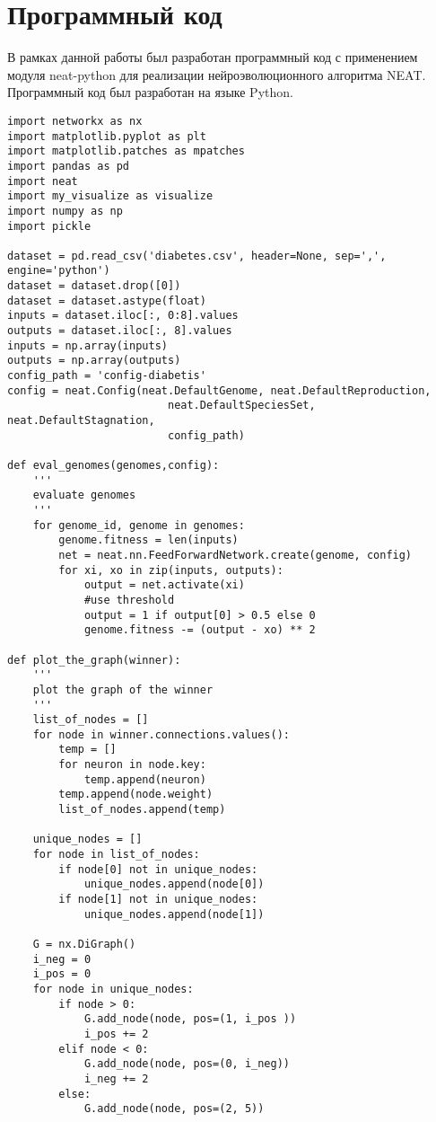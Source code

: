 \section{Программный код}
В рамках данной работы был разработан программный код с применением модуля neat-python для реализации нейроэволюционного алгоритма NEAT. Программный код был разработан на языке Python.

\begin{lstlisting}[style=pythonstyle, caption={Программный код реализации алгоритма NEAT с применением модуля neat-python}, label={lst:pythoncode}]
import networkx as nx
import matplotlib.pyplot as plt
import matplotlib.patches as mpatches
import pandas as pd
import neat
import my_visualize as visualize
import numpy as np
import pickle

dataset = pd.read_csv('diabetes.csv', header=None, sep=',', engine='python')
dataset = dataset.drop([0])
dataset = dataset.astype(float)
inputs = dataset.iloc[:, 0:8].values
outputs = dataset.iloc[:, 8].values
inputs = np.array(inputs)
outputs = np.array(outputs)
config_path = 'config-diabetis'
config = neat.Config(neat.DefaultGenome, neat.DefaultReproduction,
                         neat.DefaultSpeciesSet, neat.DefaultStagnation,
                         config_path)

def eval_genomes(genomes,config):
    '''
    evaluate genomes
    '''
    for genome_id, genome in genomes:
        genome.fitness = len(inputs)
        net = neat.nn.FeedForwardNetwork.create(genome, config)
        for xi, xo in zip(inputs, outputs):
            output = net.activate(xi)
            #use threshold
            output = 1 if output[0] > 0.5 else 0
            genome.fitness -= (output - xo) ** 2

def plot_the_graph(winner):
    '''
    plot the graph of the winner
    '''
    list_of_nodes = []
    for node in winner.connections.values():
        temp = []
        for neuron in node.key:
            temp.append(neuron)
        temp.append(node.weight)
        list_of_nodes.append(temp)
    
    unique_nodes = []
    for node in list_of_nodes:
        if node[0] not in unique_nodes:
            unique_nodes.append(node[0])
        if node[1] not in unique_nodes:
            unique_nodes.append(node[1])
    
    G = nx.DiGraph()
    i_neg = 0
    i_pos = 0
    for node in unique_nodes:
        if node > 0:
            G.add_node(node, pos=(1, i_pos ))
            i_pos += 2
        elif node < 0:
            G.add_node(node, pos=(0, i_neg))
            i_neg += 2
        else:
            G.add_node(node, pos=(2, 5))


\end{lstlisting}
